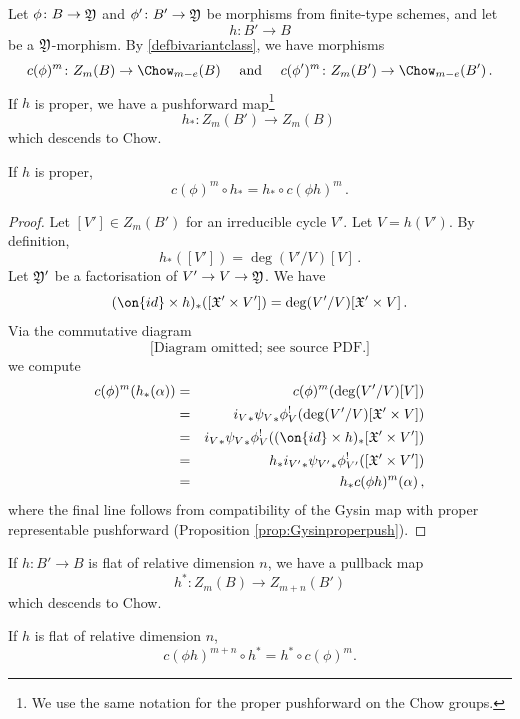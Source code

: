 Let $\phi\colon B \to \frak Y$ and $\phi'\colon B' \to \frak Y$ be morphisms from finite-type schemes, and let
$$h\colon B' \to B$$ be a $\frak Y$-morphism. By \cref{defbivariantclass}, we have morphisms
\[c(\phi)^{m} \colon Z_m(B) \to \Chow_{m-e}(B)
\ \ \ \
\text{and}
\ \ \ \
c(\phi')^{m} \colon Z_m(B') \to \Chow_{m-e}(B')\, .
\]
If $h$ is proper, we have a pushforward map{\footnote{We use the same notation for the proper pushforward on the Chow groups.}}
\[h_*\colon Z_m(B') \to Z_m(B)\, \]
which descends to Chow.
\begin{lemma}
\notready\label{lem:C1proper}
If $h$ is proper,
 $$c(\phi)^m\circ h_* = h_*\circ c(\phi h)^m\, . $$
\end{lemma}
\begin{proof}
Let $[V']\in Z_m(B')$ for
an irreducible cycle $V'$. Let $V = h(V')$. By definition, $$h_*([V']) = \deg(V'/V) [V]\, .$$ Let $\frak Y'$ be a factorisation of $V' \to V \to \frak Y$. We have
$$(\on{id}\times h)_*([\frak X' \times V']) = \deg(V'/V) [\frak X' \times V]\, . $$
Via the commutative diagram
\begin{equation}
\text{[Diagram omitted; see source PDF.]}
\end{equation}
we compute
\begin{eqnarray*}
    c(\phi)^{m} (h_*(\alpha)) &=& c(\phi)^{m} (\deg(V'/V) [V])\\
    &=& {i_V}_* {\psi_V}_* \phi_V^! (\deg(V'/V) [\frak X' \times V]) \\
    &=& {i_V}_* {\psi_V}_* \phi_V^! ( (\on{id} \times h)_* [\frak X' \times V']) \\
    &=& h_* {i_{V'}}_* {\psi_{V'}}_* \phi_{V'}^! ( [\frak X' \times V'])    \\
    &=& h_* c(\phi h)^m(\alpha)\, ,
\end{eqnarray*}
where the final line follows from compatibility of the Gysin map with proper representable pushforward (Proposition \ref{prop:Gysinproperpush}).
\end{proof}

If $h:B'\to B$  is flat of relative dimension $n$, we have a pullback map
\[h^*\colon Z_m(B) \to Z_{m+n}(B') \]
which descends to Chow.

\begin{lemma}
\notready\label{lem:C2flat}
If $h$ is flat of relative dimension $n$,
$$c(\phi h)^{m+n} \circ h^* = h^* \circ c(\phi)^m. $$
\end{lemma}

